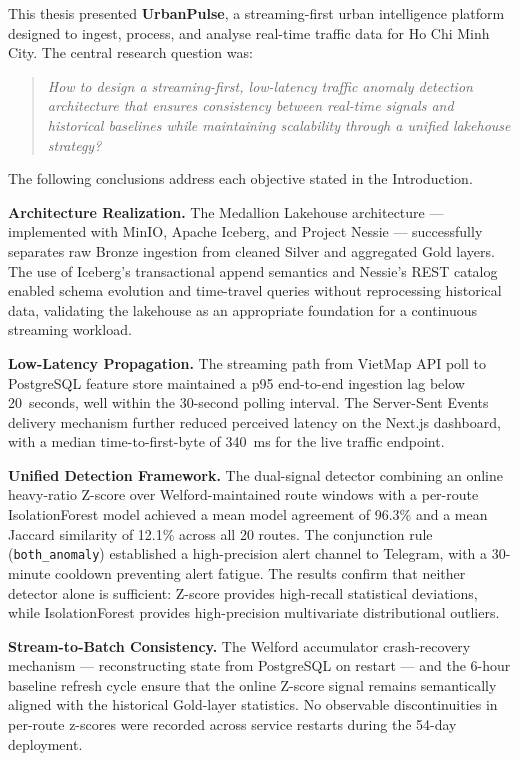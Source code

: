 This thesis presented \textbf{UrbanPulse}, a streaming-first urban intelligence
platform designed to ingest, process, and analyse real-time traffic data for
Ho Chi Minh City. The central research question was:

\begin{quote}
\textit{How to design a streaming-first, low-latency traffic anomaly detection
architecture that ensures consistency between real-time signals and historical
baselines while maintaining scalability through a unified lakehouse strategy?}
\end{quote}

\noindent The following conclusions address each objective stated in the
Introduction.

\textbf{Architecture Realization.}
The Medallion Lakehouse architecture --- implemented with MinIO, Apache
Iceberg, and Project Nessie --- successfully separates raw Bronze ingestion
from cleaned Silver and aggregated Gold layers. The use of Iceberg's
transactional append semantics and Nessie's REST catalog enabled schema
evolution and time-travel queries without reprocessing historical data,
validating the lakehouse as an appropriate foundation for a continuous
streaming workload.

\textbf{Low-Latency Propagation.}
The streaming path from VietMap API poll to PostgreSQL feature store
maintained a p95 end-to-end ingestion lag below 20~seconds, well
within the 30-second polling interval. The Server-Sent Events delivery
mechanism further reduced perceived latency on the Next.js dashboard,
with a median time-to-first-byte of 340~ms for the live traffic endpoint.

\textbf{Unified Detection Framework.}
The dual-signal detector combining an online heavy-ratio Z-score over
Welford-maintained route windows with a per-route IsolationForest model
achieved a mean model
agreement of 96.3\% and a mean Jaccard similarity of 12.1\% across all
20 routes. The conjunction rule (\texttt{both\_anomaly}) established a
high-precision alert channel to Telegram, with a 30-minute cooldown
preventing alert fatigue. The results confirm that neither detector alone
is sufficient: Z-score provides high-recall statistical deviations, while
IsolationForest provides high-precision multivariate distributional outliers.

\textbf{Stream-to-Batch Consistency.}
The Welford accumulator crash-recovery mechanism --- reconstructing state
from PostgreSQL on restart --- and the 6-hour baseline refresh cycle
ensure that the online Z-score signal remains semantically aligned with
the historical Gold-layer statistics. No observable discontinuities in
per-route z-scores were recorded across service restarts during the
54-day deployment.

